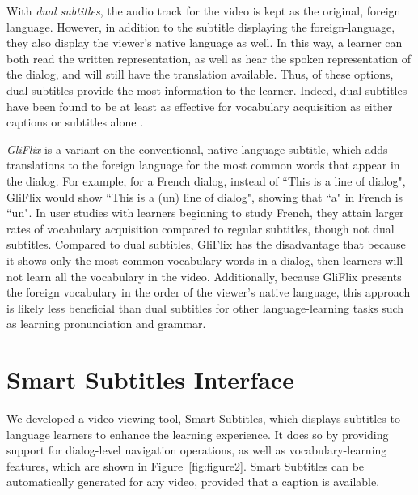 \documentclass{sigchi}
\begin{document}
With \emph{dual subtitles}, the audio track for the video is kept as the original, foreign language.
However, in addition to the subtitle displaying the foreign-language, they also display the
viewer's native language as well. In this way, a learner can both read the written representation,
as well as hear the spoken representation of the dialog, and will still have the translation
available. Thus, of these options, dual subtitles provide the most information to the learner.
Indeed, dual subtitles have been found to be at least as effective for vocabulary acquisition as
either captions or subtitles alone \cite{raine2012incidental}.

\emph{GliFlix} \cite{gliflix} is a variant on the conventional, native-language subtitle, which adds translations to the foreign language for the most common words that
appear in the dialog. For example, for a French dialog, instead of ``This is a line of dialog", GliFlix would show ``This is a (un) line of dialog", showing that ``a" in French is ``un". In user studies with learners beginning to study French, they attain larger rates of vocabulary acquisition compared to regular
subtitles, though not dual subtitles. Compared to dual subtitles, GliFlix has the disadvantage that because it shows only the most common vocabulary words in a dialog, then learners will not learn all the vocabulary in the video. Additionally, because GliFlix presents the foreign vocabulary in the order of the viewer's native language, this approach is likely less beneficial than dual subtitles for
other language-learning tasks such as learning pronunciation and grammar.

\section{Smart Subtitles Interface}

We developed a video viewing tool, Smart Subtitles, which displays subtitles to language learners to enhance the learning experience. It does so by providing support for dialog-level navigation operations, as well as vocabulary-learning features, which are shown in Figure~\ref{fig:figure2}. Smart Subtitles can be automatically generated for any video, provided that a caption is available.
\end{document}
